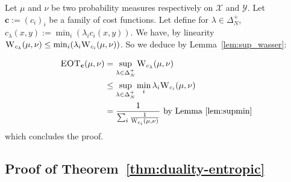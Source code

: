 \begin{prv*}
Let $\mu$ and $\nu$ be two probability measures respectively on $\mathcal{X}$ and $\mathcal{Y}$. Let $\mathbf{c}:=(c_i)_i$ be a family of cost functions. Let define for $\lambda\in\Delta_N^{+}$, $c_\lambda(x,y) := \min_i(\lambda_i c_i(x,y))$. We have, by linearity $\textsc{W}_{c_\lambda}(\mu,\nu)\leq \min_i(\lambda_i \textsc{W}_{c_i}(\mu,\nu))$. So we deduce by Lemma~\ref{lem:sup_wasser}:

\begin{align*}
    \textsc{EOT}_{\mathbf{c}}(\mu,\nu)&=\sup_{\lambda\in\Delta_N^{+}} \textsc{W}_{c_\lambda}(\mu,\nu)\\
    &\leq\sup_{\lambda\in\Delta_N^{+}} \min_i\lambda_i \textsc{W}_{c_i}(\mu,\nu)\\
    &= \frac{1}{\sum_i\frac{1}{\textsc{W}_{c_i}(\mu,\nu)}}\text{ by Lemma~\ref{lem:supmin}}\\ 
\end{align*}
which concludes the proof.
\end{prv*}




\subsection{Proof of Theorem~\ref{thm:duality-entropic}}
\label{prv:duality-entropic}




